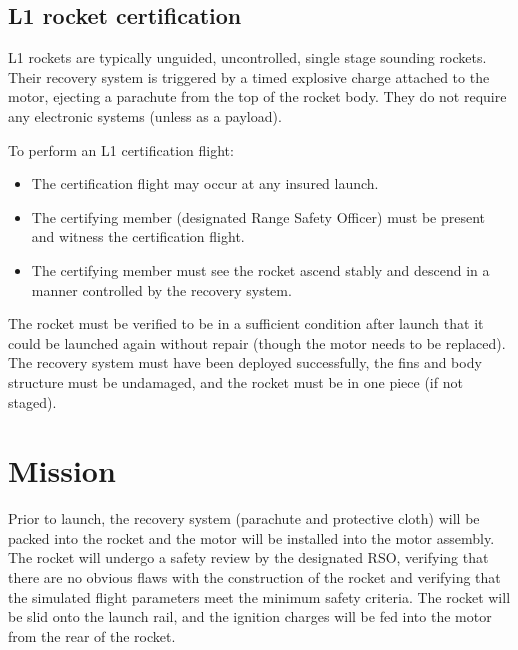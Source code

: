 \documentclass{article}
\begin{document}
\subsection{L1 rocket certification}


L1 rockets are typically unguided, 
uncontrolled, 
single stage sounding rockets. 
Their recovery system is triggered by a timed explosive charge attached to the motor, 
ejecting a parachute from the top of the rocket body. 
They do not require any electronic systems (unless as a payload).

To perform an L1 certification flight:
\begin{itemize}
    \item The certification flight may occur at any insured launch.
    \item The certifying member (designated Range Safety Officer) must be present 
	and witness the certification flight.
    \item The certifying member must see the rocket ascend stably 
	and descend in a manner controlled by the recovery system.
\end{itemize}

The rocket must be verified to be in a sufficient condition after launch that it could be launched again without repair 
(though the motor needs to be replaced). 
The recovery system must have been deployed successfully, 
the fins and body structure must be undamaged, 
and the rocket must be in one piece (if not staged).

\section{Mission}


Prior to launch, 
the recovery system (parachute and protective cloth) will be packed into the rocket 
and the motor will be installed into the motor assembly. 
The rocket will undergo a safety review by the designated RSO, 
verifying that there are no obvious flaws with the construction of the rocket 
and verifying that the simulated flight parameters meet the minimum safety criteria. 
The rocket will be slid onto the launch rail, 
and the ignition charges will be fed into the motor from the rear of the rocket.
\end{document}
